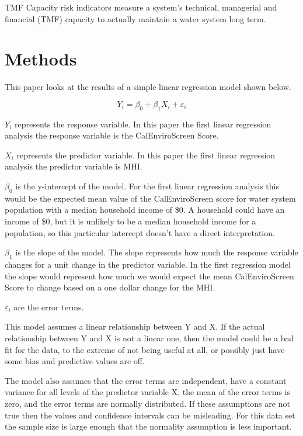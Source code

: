 \documentclass[
  letterpaper,
  DIV=11,
  numbers=noendperiod]{scrartcl}
\begin{document}
TMF Capacity risk indicators measure a system's technical, managerial
and financial (TMF) capacity to actually maintain a water system long
term.

\section{Methods}\label{sec-methods}

This paper looks at the results of a simple linear regression model
shown below.

\[Y_i = \beta_0 +\beta_1 X_i + \varepsilon_i\]

\(Y_i\) represents the response variable. In this paper the first linear
regression analysis the response variable is the CalEnviroScreen Score.

\(X_i\) represents the predictor variable. In this paper the first
linear regression analysis the predictor variable is MHI.

\(\beta_0\) is the y-intercept of the model. For the first linear
regression analysis this would be the expected mean value of the
CalEnviroScreen score for water system population with a median
household income of \$0. A household could have an income of \$0, but it
is unlikely to be a median household income for a population, so this
particular intercept doesn't have a direct interpretation.

\(\beta_1\) is the slope of the model. The slope represents how much the
response variable changes for a unit change in the predictor variable.
In the first regression model the slope would represent how much we
would expect the mean CalEnviroScreen Score to change based on a one
dollar change for the MHI.

\(\varepsilon_i\) are the error terms.

This model assumes a linear relationship between Y and X. If the actual
relationship between Y and X is not a linear one, then the model could
be a bad fit for the data, to the extreme of not being useful at all, or
possibly just have some bias and predictive values are off.

The model also assumes that the error terms are independent, have a
constant variance for all levels of the predictor variable X, the mean
of the error terms is zero, and the error terms are normally
distributed. If these assumptions are not true then the values and
confidence intervals can be misleading. For this data set the sample
size is large enough that the normality assumption is less important.
\end{document}
